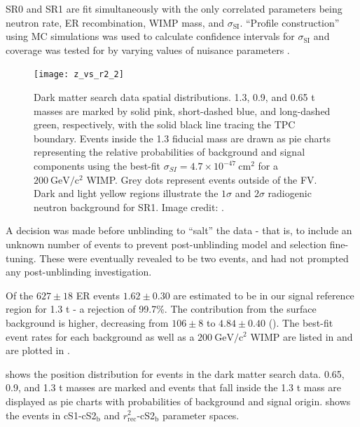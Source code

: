 SR0 and SR1 are fit simultaneously with the only correlated parameters being neutron rate, ER recombination, WIMP mass, and
$\sigma_{\mathrm{SI}}$.  ``Profile construction'' using MC simulations was used to calculate confidence intervals for
$\sigma_{\mathrm{SI}}$ and coverage was tested for by varying values of nuisance parameters .

\begin{figure}
\centering
\texttt{[image: z\_vs\_r2\_2]}
\caption[Dark matter search data spatial distributions with background and signal probabilities.]{Dark matter search data spatial
distributions.  1.3, 0.9, and 0.65 t masses are marked by solid pink, short-dashed blue, and
long-dashed green, respectively, with the solid black line tracing the TPC boundary.  Events inside the 1.3 fiducial mass are drawn as pie
charts representing the relative probabilities of background and signal components using the best-fit
$\sigma_{SI} = 4.7 \times 10^{-47}\ \mathrm{cm^2}$ for a $200\ \mathrm{GeV/c^2}$ WIMP.  Grey dots represent events outside of the FV.  Dark and light
yellow regions illustrate the $1 \sigma$ and $2 \sigma$ radiogenic neutron background for SR1.  Image credit: .}
\label{fig:dark_matter_results_position}
\end{figure}

A decision was made before unblinding to ``salt'' the data - that is, to include an unknown number of events to prevent post-unblinding
model and selection fine-tuning.  These were eventually revealed to be two \ambe events, and had not prompted any post-unblinding
investigation.

Of the $627 \pm 18$ ER events $1.62 \pm 0.30$ are estimated to be in our signal reference region for 1.3 t - a rejection
of 99.7\%.  The contribution from the surface background is higher, decreasing from $106 \pm 8$ to
$4.84 \pm 0.40$ ().  The best-fit event rates
for each background as well as a $200\ \mathrm{GeV/c^2}$ WIMP are listed in  and are plotted in
.

 shows the position distribution for events in the dark matter search data.  0.65, 0.9, and 1.3 t
masses are marked and events that fall inside the 1.3 t mass are displayed as pie charts with probabilities of background and
signal origin.   shows the events in cS1-cS2$_{\mathrm{b}}$ and
$r_{\mathrm{rec}}^2$-cS2$_{\mathrm{b}}$ parameter spaces.

